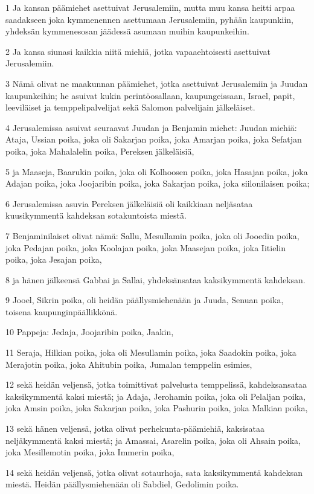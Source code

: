 \par 1 Ja kansan päämiehet asettuivat Jerusalemiin, mutta muu kansa heitti arpaa saadakseen joka kymmenennen asettumaan Jerusalemiin, pyhään kaupunkiin, yhdeksän kymmenesosan jäädessä asumaan muihin kaupunkeihin.
\par 2 Ja kansa siunasi kaikkia niitä miehiä, jotka vapaaehtoisesti asettuivat Jerusalemiin.
\par 3 Nämä olivat ne maakunnan päämiehet, jotka asettuivat Jerusalemiin ja Juudan kaupunkeihin; he asuivat kukin perintöosallaan, kaupungeissaan, Israel, papit, leeviläiset ja temppelipalvelijat sekä Salomon palvelijain jälkeläiset.
\par 4 Jerusalemissa asuivat seuraavat Juudan ja Benjamin miehet: Juudan miehiä: Ataja, Ussian poika, joka oli Sakarjan poika, joka Amarjan poika, joka Sefatjan poika, joka Mahalalelin poika, Pereksen jälkeläisiä,
\par 5 ja Maaseja, Baarukin poika, joka oli Kolhoosen poika, joka Hasajan poika, joka Adajan poika, joka Joojaribin poika, joka Sakarjan poika, joka siilonilaisen poika;
\par 6 Jerusalemissa asuvia Pereksen jälkeläisiä oli kaikkiaan neljäsataa kuusikymmentä kahdeksan sotakuntoista miestä.
\par 7 Benjaminilaiset olivat nämä: Sallu, Mesullamin poika, joka oli Jooedin poika, joka Pedajan poika, joka Koolajan poika, joka Maasejan poika, joka Iitielin poika, joka Jesajan poika,
\par 8 ja hänen jälkeensä Gabbai ja Sallai, yhdeksänsataa kaksikymmentä kahdeksan.
\par 9 Jooel, Sikrin poika, oli heidän päällysmiehenään ja Juuda, Senuan poika, toisena kaupunginpäällikkönä.
\par 10 Pappeja: Jedaja, Joojaribin poika, Jaakin,
\par 11 Seraja, Hilkian poika, joka oli Mesullamin poika, joka Saadokin poika, joka Merajotin poika, joka Ahitubin poika, Jumalan temppelin esimies,
\par 12 sekä heidän veljensä, jotka toimittivat palvelusta temppelissä, kahdeksansataa kaksikymmentä kaksi miestä; ja Adaja, Jerohamin poika, joka oli Pelaljan poika, joka Amsin poika, joka Sakarjan poika, joka Pashurin poika, joka Malkian poika,
\par 13 sekä hänen veljensä, jotka olivat perhekunta-päämiehiä, kaksisataa neljäkymmentä kaksi miestä; ja Amassai, Asarelin poika, joka oli Ahsain poika, joka Mesillemotin poika, joka Immerin poika,
\par 14 sekä heidän veljensä, jotka olivat sotaurhoja, sata kaksikymmentä kahdeksan miestä. Heidän päällysmiehenään oli Sabdiel, Gedolimin poika.
